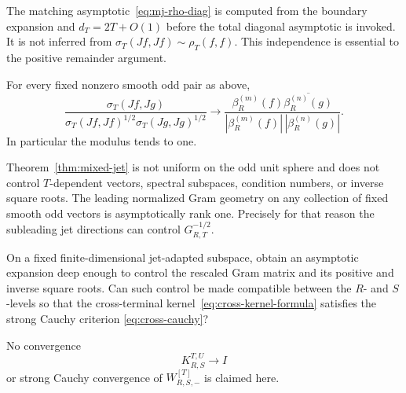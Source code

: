 \begin{remark}\label{rem:mixed-noncircular}
The matching asymptotic~\eqref{eq:mj-rho-diag} is computed from the boundary expansion and
$d_T=2T+O(1)$ before the total diagonal asymptotic is invoked.  It is not inferred from
$\sigma_T(Jf,Jf)\sim\rho_T(f,f)$.  This independence is essential to the positive
remainder argument.
\end{remark}

\begin{corollary}\label{cor:mixed-angle}
For every fixed nonzero smooth odd pair as above,
\[
 \boxed{
 \frac{\sigma_T(Jf,Jg)}
 {\sigma_T(Jf,Jf)^{1/2}\sigma_T(Jg,Jg)^{1/2}}
 \longrightarrow
 \frac{\beta_R^{(m)}(f)\overline{\beta_R^{(n)}(g)}}
 {|\beta_R^{(m)}(f)|\,|\beta_R^{(n)}(g)|}.
 }
\tag{MJ.12}\label{eq:mj-angle}
\]
In particular the modulus tends to one.
\end{corollary}

\begin{remark}\label{rem:mixed-firewall}
Theorem~\ref{thm:mixed-jet} is not uniform on the odd unit sphere and does not control
$T$-dependent vectors, spectral subspaces, condition numbers, or inverse square roots.
The leading normalized Gram geometry on any collection of fixed smooth odd vectors is
asymptotically rank one.  Precisely for that reason the subleading jet directions can
control $G_{R,T}^{-1/2}$.
\end{remark}

\begin{openproblem}\label{open:finite-jet-sqrt}
On a fixed finite-dimensional jet-adapted subspace, obtain an asymptotic expansion deep
enough to control the rescaled Gram matrix and its positive and inverse square roots.
Can such control be made compatible between the $R$- and $S$-levels so that the
cross-terminal kernel~\eqref{eq:cross-kernel-formula} satisfies the strong Cauchy criterion
\eqref{eq:cross-cauchy}?
\end{openproblem}

No convergence
\[
 K_{R,S}^{T,U}\to I
\]
or strong Cauchy convergence of $W_{R,S,-}^{[T]}$ is claimed here.
